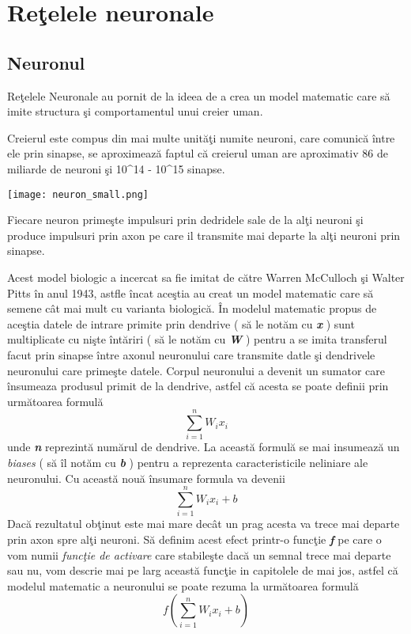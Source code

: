 \chapter{Re\c{t}elele neuronale}

\section{Neuronul}

Re\c{t}elele Neuronale au pornit de la ideea de a crea un model matematic care s\u{a} imite structura \c{s}i comportamentul unui creier uman.
\par
Creierul este compus din mai multe unit\u{a}\c{t}i numite neuroni, care comunic\u{a} \^{i}ntre ele prin sinapse, se aproximeaz\u{a} faptul c\u{a} creierul uman are aproximativ 86 de miliarde de neuroni \c{s}i 10^{14} - 10^{15}  sinapse.

\begin{center}
\texttt{[image: neuron\_small.png]}
\end{center}

Fiecare neuron prime\c{s}te impulsuri prin dedridele sale de la al\c{t}i neuroni \c{s}i produce impulsuri prin axon pe care il transmite mai departe la al\c{t}i neuroni prin sinapse.

\par

Acest model biologic a incercat sa fie imitat de c\u{a}tre Warren McCulloch \c{s}i Walter Pitts \^{i}n anul 1943, astfle \^{i}ncat ace\c{s}tia au creat un model matematic care s\u{a} semene c\^{a}t mai mult cu varianta biologic\u{a}. \^{I}n modelul matematic propus de ace\c{s}tia datele de intrare primite prin dendrive ( s\u{a} le not\u{a}m cu \textbf{\textit{x}} ) sunt multiplicate cu ni\c{s}te \^{i}nt\u{a}riri ( s\u{a} le not\u{a}m cu \textbf{\textit{W}} ) pentru a se imita transferul facut prin sinapse \^{i}ntre axonul neuronului care transmite datle \c{s}i dendrivele neuronului care prime\c{s}te datele. Corpul neuronului a devenit un sumator care \^{i}nsumeaza produsul primit de la dendrive, astfel c\u{a} acesta se poate definii prin urm\u{a}toarea formul\u{a}  $$ \sum_{i=1}^{n} W_i x_i $$ unde \textbf{\textit{n}} reprezint\u{a} num\u{a}rul de dendrive. La aceast\u{a} formul\u{a} se mai insumeaz\u{a} un \textit{biases} ( s\u{a} \^{i}l not\u{a}m cu \textbf{\textit{b}} ) pentru a reprezenta caracteristicile neliniare ale neuronului. Cu aceast\u{a} nou\u{a} \^{i}nsumare formula va devenii $$ \sum_{i=1}^{n} W_i x_i + b $$
Dac\u{a} rezultatul ob\c{t}inut este mai mare dec\^{a}t un prag acesta va trece mai departe prin axon spre al\c{t}i neuroni. S\u{a} definim acest efect printr-o func\c{t}ie \textbf{\textit{f}} pe care o vom numii \textit{func\c{t}ie de activare} care stabile\c{s}te dac\u{a} un semnal trece mai departe sau nu, vom descrie mai pe larg aceast\u{a} func\c{t}ie in capitolele de mai jos, astfel c\u{a} modelul matematic a neuronului se poate rezuma la urm\u{a}toarea formul\u{a} 
$$f( \sum_{i=1}^{n} W_i x_i + b ) $$

